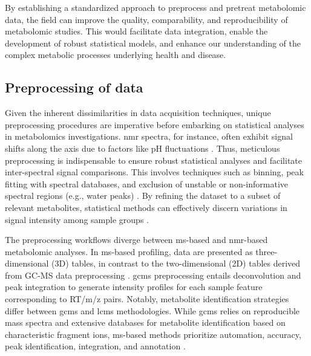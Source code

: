 \documentclass[ENG, BIB]{TFUOC}%
\begin{document}
By establishing a standardized approach to preprocess and pretreat metabolomic data, the field can improve the quality, comparability, and reproducibility of metabolomic studies. This would facilitate data integration, enable the development of robust statistical models, and enhance our understanding of the complex metabolic processes underlying health and disease.


\subsection{Preprocessing of data}

Given the inherent dissimilarities in data acquisition techniques, unique preprocessing procedures are imperative before embarking on statistical analyses in metabolomics investigations. \acrshort{nmr} spectra, for instance, often exhibit signal shifts along the axis due to factors like pH fluctuations \cite{bhinderwalaChemicalShiftVariations2022}. Thus, meticulous preprocessing is indispensable to ensure robust statistical analyses and facilitate inter-spectral signal comparisons. This involves techniques such as binning, peak fitting with spectral databases, and exclusion of unstable or non-informative spectral regions (e.g., water peaks) \cite{chenGuideMetabolomicsAnalysis2022a,sunPretreatingNormalizingMetabolomics2024,stanstrupMetaRbolomicsToolboxBioconductor2019}. By refining the dataset to a subset of relevant metabolites, statistical methods can effectively discern variations in signal intensity among sample groups \cite{qiuSmallMoleculeMetabolites2023}.


The preprocessing workflows diverge between \acrshort{ms}-based and \acrshort{nmr}-based metabolomic analyses. In \acrshort{ms}-based profiling, data are presented as three-dimensional (3D) tables, in contrast to the two-dimensional (2D) tables derived from GC-MS data preprocessing \cite{sunPretreatingNormalizingMetabolomics2024,stanstrupMetaRbolomicsToolboxBioconductor2019}. \acrshort{gcms} preprocessing entails deconvolution and peak integration to generate intensity profiles for each sample feature corresponding to {RT/m/z} pairs. Notably, metabolite identification strategies differ between \acrshort{gcms} and \acrshort{lcms} methodologies. While \acrshort{gcms} relies on reproducible mass spectra and extensive databases for metabolite identification based on characteristic fragment ions, \acrshort{ms}-based methods prioritize automation, accuracy, peak identification, integration, and annotation \cite{xiaoMetaboliteIdentificationQuantitation2012,kiselevaDefiningBloodPlasma2021}.
\end{document}
